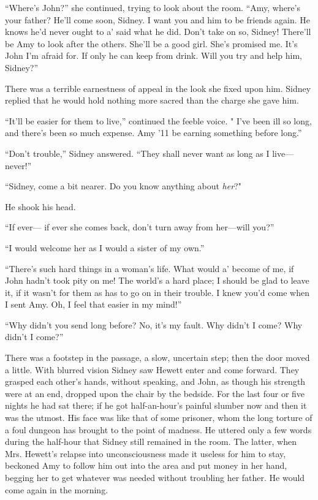 ``Where's John?'' she continued, trying to look about the room. ``Amy,
where's your father? He'll come soon, Sidney. I want you and him to be
friends again. He knows he'd never ought to a' said what he did. Don't
take on so, Sidney! There'll be Amy to look after the others. She'll be
a good girl. She's promised me. It's John I'm afraid for. If only he can
keep from drink. Will you try and help him, Sidney?''

There was a terrible earnestness of appeal
{\protect\hypertarget{169}{}{}}in the look she fixed upon him. Sidney
replied that he would hold nothing more sacred than the charge she gave
him.

``It'll be easier for them to live,'' continued the feeble voice. " I've
been ill so long, and there's been so much expense. Amy '11 be earning
something before long.''

``Don't trouble,'' Sidney answered. ``They shall never want as long as I
live---never!''

``Sidney, come a bit nearer. Do you know anything about \emph{her}?"

He shook his head.

``If ever--- if ever she comes back, don't turn away from her---will
you?''

``I would welcome her as I would a sister of my own.''

``There's such hard things in a woman's life. What would a' become of
me, if John hadn't took pity on me! The world's a hard place; I should
be glad to leave it, if it wasn't for them as has to go on in their
trouble. I knew you'd come when I sent Amy. Oh, I feel that easier in my
mind!''

``Why didn't you send long before? No,
{\protect\hypertarget{170}{}{}}it's my fault. Why didn't I come? Why
didn't I come?''

There was a footstep in the passage, a slow, uncertain step; then the
door moved a little. With blurred vision Sidney saw Hewett enter and
come forward. They grasped each other's hands, without speaking, and
John, as though his strength were at an end, dropped upon the chair by
the bedside. For the last four or five nights he had sat there; if he
got half-an-hour's painful slumber now and then it was the utmost. His
face was like that of some prisoner, whom the long torture of a foul
dungeon has brought to the point of madness. He uttered only a few words
during the half-hour that Sidney still remained in the room. The latter,
when Mrs. Hewett's relapse into unconsciousness made it useless for him
to stay, beckoned Amy to follow him out into the area and put money in
her hand, begging her to get whatever was needed without troubling her
father. He would come again in the morning.

